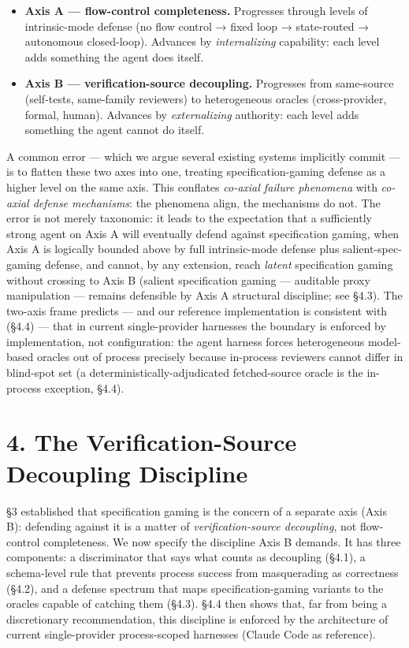 \documentclass[
  11pt,
]{article}
\providecommand{\tightlist}{%
  \setlength{\itemsep}{0pt}\setlength{\parskip}{0pt}}
\begin{document}
\begin{itemize}
\tightlist
\item
  \textbf{Axis A --- flow-control completeness.} Progresses through
  levels of intrinsic-mode defense (no flow control → fixed loop →
  state-routed → autonomous closed-loop). Advances by
  \emph{internalizing} capability: each level adds something the agent
  does itself.
\item
  \textbf{Axis B --- verification-source decoupling.} Progresses from
  same-source (self-tests, same-family reviewers) to heterogeneous
  oracles (cross-provider, formal, human). Advances by
  \emph{externalizing} authority: each level adds something the agent
  cannot do itself.
\end{itemize}

A common error --- which we argue several existing systems implicitly
commit --- is to flatten these two axes into one, treating
specification-gaming defense as a higher level on the same axis. This
conflates \emph{co-axial failure phenomena} with \emph{co-axial defense
mechanisms}: the phenomena align, the mechanisms do not. The error is
not merely taxonomic: it leads to the expectation that a sufficiently
strong agent on Axis A will eventually defend against specification
gaming, when Axis A is logically bounded above by full intrinsic-mode
defense plus salient-spec-gaming defense, and cannot, by any extension,
reach \emph{latent} specification gaming without crossing to Axis B
(salient specification gaming --- auditable proxy manipulation ---
remains defensible by Axis A structural discipline; see §4.3). The
two-axis frame predicts --- and our reference implementation is
consistent with (§4.4) --- that in current single-provider harnesses the
boundary is enforced by implementation, not configuration: the agent
harness forces heterogeneous model-based oracles out of process
precisely because in-process reviewers cannot differ in blind-spot set
(a deterministically-adjudicated fetched-source oracle is the in-process
exception, §4.4).

\section{4. The Verification-Source Decoupling
Discipline}\label{the-verification-source-decoupling-discipline}

§3 established that specification gaming is the concern of a separate
axis (Axis B): defending against it is a matter of
\emph{verification-source decoupling}, not flow-control completeness. We
now specify the discipline Axis B demands. It has three components: a
discriminator that says what counts as decoupling (§4.1), a schema-level
rule that prevents process success from masquerading as correctness
(§4.2), and a defense spectrum that maps specification-gaming variants
to the oracles capable of catching them (§4.3). §4.4 then shows that,
far from being a discretionary recommendation, this discipline is
enforced by the architecture of current single-provider process-scoped
harnesses (Claude Code as reference).
\end{document}
